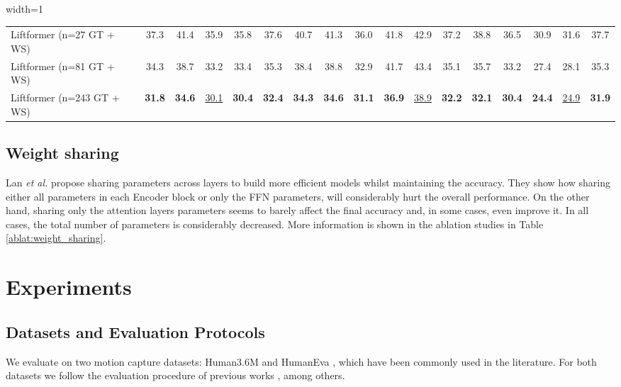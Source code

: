 \documentclass[letterpaper]{article}
\begin{document}
\begin{table*}[tp]
\begin{adjustbox}{width=1\textwidth}
\begin{tabular}{l|ccccccccccccccc|c}
\hline
Liftformer (n=27 GT + WS) & 37.3 & 41.4 & 35.9 & 35.8 & 37.6 & 40.7 & 41.3 & 36.0 & 41.8 & 42.9 & 37.2 & 38.8 & 36.5 & 30.9 & 31.6 & 37.7\\
Liftformer (n=81 GT + WS) & 34.3 & 38.7 & 33.2 & 33.4 & 35.3 & 38.4 & 38.8 & 32.9 & 41.7 & 43.4 & 35.1 & 35.7 & 33.2 & 27.4 & 28.1 & 35.3\\
Liftformer (n=243 GT + WS) & \textbf{31.8} & \textbf{34.6} & \underline{30.1} & \textbf{30.4} & \textbf{32.4} & \textbf{34.3} & \textbf{34.6} & \textbf{31.1} & \textbf{36.9} & \underline{38.9} & \textbf{32.2} & \textbf{32.1} & \textbf{30.4} & \textbf{24.4} & \underline{24.9} & \textbf{31.9}\\
\end{tabular}
\end{adjustbox}

\caption{\textbf{Protocol 1} with MPJPE (mm): Reconstruction error on Human3.6M. Input 2D joints from ground truth. GT - Ground truth. WS - Weight sharing between attention layers}
\label{h36m:mpjpeGT}
\end{table*}


\subsection{Weight sharing}
Lan \textit{et al.} \cite{lan19} propose sharing parameters across layers to build more efficient models whilst maintaining the accuracy. They show how sharing either all parameters in each Encoder block or only the FFN parameters, will considerably hurt the overall performance. On the other hand, sharing only the attention layers parameters seems to barely affect the final accuracy and, in some cases, even improve it. In all cases, the total number of parameters is considerably decreased. More information is shown in the ablation studies in Table \ref{ablat:weight_sharing}.

\section{Experiments}
\subsection{Datasets and Evaluation Protocols}
We evaluate on two motion capture datasets: Human3.6M \cite{ionescu13} and HumanEva \cite{sigal10} , which have been commonly used in the literature. For both datasets we follow the evaluation procedure of previous works \cite{lee18, cheng19, pavllo19, zhou19, liu20, cheng20}, among others.
\end{document}
